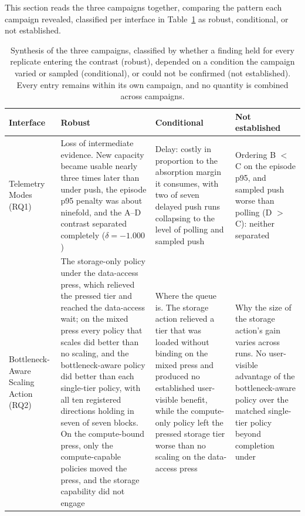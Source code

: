 ﻿\documentclass[12pt,reqno,twoside]{amsbook}
\begin{document}
This section reads the three campaigns together, comparing the pattern each
campaign revealed, classified per interface in Table~\ref{tab:synthesis} as
robust, conditional, or not established.

\begin{table}[H]
    \centering
    \caption{Synthesis of the three campaigns, classified by whether a
    finding held for every replicate entering the contrast (robust),
    depended on a condition the campaign varied or sampled (conditional), or
    could not be confirmed (not established). Every entry remains within its
    own campaign, and no quantity is combined across campaigns.}
    \label{tab:synthesis}
    \footnotesize
    \setlength{\tabcolsep}{3pt}
    \begin{tabular}{p{} p{} p{} p{}}
        \toprule
        Interface & Robust & Conditional & Not established \\
        \midrule
        Telemetry Modes (RQ1) & Loss of intermediate evidence. New
        capacity became usable nearly three times later than under push,
        the episode p95 penalty was about ninefold, and the A--D contrast
        separated completely ($\delta = -1.000$) & Delay: costly in
        proportion to the absorption margin it consumes, with two of seven
        delayed push runs collapsing to the level of polling and sampled
        push & Ordering B $<$ C on the episode p95, and sampled push worse
        than polling (D $>$ C): neither separated \\
        Bottleneck-Aware Scaling Action (RQ2) & The storage-only policy under
        the data-access press, which relieved the pressed tier and reached
        the data-access wait; on the mixed press every policy that scales did
        better than no scaling, and the bottleneck-aware policy did better
        than each single-tier policy, with all ten registered directions
        holding in seven of seven blocks. On the compute-bound press, only
        the compute-capable policies moved the press, and the storage
        capability did not engage & Where the queue is. The
        storage action relieved a tier that was loaded without binding on
        the mixed press and produced no established user-visible benefit, while
        the compute-only policy left the pressed storage tier worse than no
        scaling on the data-access press & Why the size of the storage action's gain
        varies across runs. No user-visible advantage of the bottleneck-aware
        policy over the matched single-tier policy beyond completion under

\end{tabular}
\end{table}
\end{document}
